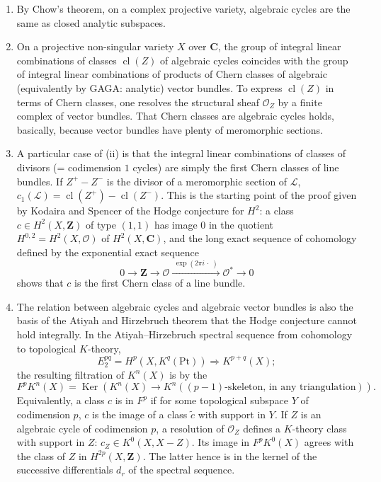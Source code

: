 \documentclass[11pt,a4paper]{article}
\theoremstyle{plain}
\theoremstyle{definition}
\DeclareMathOperator{\Ker}{Ker}
\DeclareMathOperator{\cl}{cl}
\begin{document}
\begin{enumerate}[label=(\roman*)]
\item By Chow's theorem, on a complex projective variety, algebraic cycles are the same as closed analytic subspaces.

\item On a projective non-singular variety $X$ over $\mathbf{C}$, the group of integral linear combinations of classes $\cl(Z)$ of algebraic cycles coincides with the group of integral linear combinations of products of Chern classes of algebraic (equivalently by GAGA: analytic) vector bundles. To express $\cl(Z)$ in terms of Chern classes, one resolves the structural sheaf $\mathcal{O}_{Z}$ by a finite complex of vector bundles. That Chern classes are algebraic cycles holds, basically, because vector bundles have plenty of meromorphic sections.

\item A particular case of (ii) is that the integral linear combinations of classes of divisors (= codimension $1$ cycles) are simply the first Chern classes of line bundles. If $Z^{+} - Z^{-}$ is the divisor of a meromorphic section of $\mathcal{L}$, $c_{1}(\mathcal{L}) = \cl(Z^{+}) - \cl(Z^{-})$. This is the starting point of the proof given by Kodaira and Spencer \cite{kodaira-spencer1953} of the Hodge conjecture for $H^{2}$: a class $c \in H^{2}(X,\mathbf{Z})$ of type $(1,1)$ has image $0$ in the quotient $H^{0,2} = H^{2}(X,\mathcal{O})$ of $H^{2}(X,\mathbf{C})$, and the long exact sequence of cohomology defined by the exponential exact sequence
\begin{equation*}
0 \longrightarrow \mathbf{Z} \longrightarrow \mathcal{O} \xrightarrow{\;\exp(2\pi i\,\cdot\;)\;} \mathcal{O}^{*} \longrightarrow 0
\end{equation*}
shows that $c$ is the first Chern class of a line bundle.

\item The relation between algebraic cycles and algebraic vector bundles is also the basis of the Atiyah and Hirzebruch theorem \cite{atiyah-hirzebruch1962} that the Hodge conjecture cannot hold integrally. In the Atiyah--Hirzebruch spectral sequence from cohomology to topological $K$-theory,
\begin{equation*}
E_{2}^{pq} = H^{p}(X, K^{q}(\text{Pt})) \Longrightarrow K^{p+q}(X);
\end{equation*}
the resulting filtration of $K^{n}(X)$ is by the
\begin{equation*}
F^{p}K^{n}(X) = \Ker(K^{n}(X) \to K^{n}((p-1)\text{-skeleton, in any triangulation})).
\end{equation*}
Equivalently, a class $c$ is in $F^{p}$ if for some topological subspace $Y$ of codimension $p$, $c$ is the image of a class $\tilde{c}$ with support in $Y$. If $Z$ is an algebraic cycle of codimension $p$, a resolution of $\mathcal{O}_{Z}$ defines a $K$-theory class with support in $Z$: $c_{Z} \in K^{0}(X, X-Z)$. Its image in $F^{p}K^{0}(X)$ agrees with the class of $Z$ in $H^{2p}(X,\mathbf{Z})$. The latter hence is in the kernel of the successive differentials $d_{r}$ of the spectral sequence.


\end{enumerate}
\end{document}
